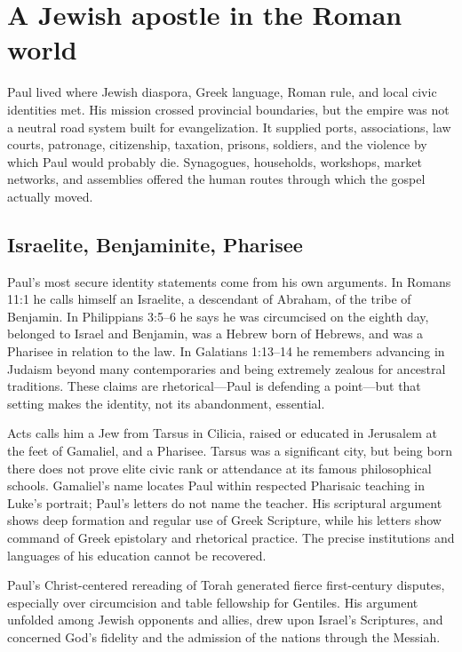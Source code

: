 \section{A Jewish apostle in the Roman world}\label{sec:paul-world}

Paul lived where Jewish diaspora, Greek language, Roman rule, and local civic
identities met. His mission crossed provincial boundaries, but the empire was
not a neutral road system built for evangelization. It supplied ports,
associations, law courts, patronage, citizenship, taxation, prisons, soldiers,
and the violence by which Paul would probably die. Synagogues, households,
workshops, market networks, and assemblies offered the human routes through
which the gospel actually moved.

\subsection{Israelite, Benjaminite, Pharisee}

Paul's most secure identity statements come from his own arguments. In
Romans 11:1 he calls himself an Israelite, a descendant of Abraham, of the
tribe of Benjamin. In Philippians 3:5--6 he says he was circumcised on the
eighth day, belonged to Israel and Benjamin, was a Hebrew born of Hebrews, and
was a Pharisee in relation to the law. In Galatians 1:13--14 he remembers
advancing in Judaism beyond many contemporaries and being extremely zealous
for ancestral traditions. These claims are rhetorical---Paul is defending a
point---but that setting makes the identity, not its abandonment, essential.

Acts calls him a Jew from Tarsus in Cilicia, raised or educated in Jerusalem
at the feet of Gamaliel, and a Pharisee. Tarsus was a significant city, but
being born there does not prove elite civic rank or attendance at its famous
philosophical schools. Gamaliel's name locates Paul within respected Pharisaic
teaching in Luke's portrait; Paul's letters do not name the teacher. His
scriptural argument shows deep formation and regular use of Greek Scripture,
while his letters show command of Greek epistolary and rhetorical practice.
The precise institutions and languages of his education cannot be recovered.

Paul's Christ-centered rereading of Torah generated fierce first-century
disputes, especially over circumcision and table fellowship for Gentiles. His
argument unfolded among Jewish opponents and allies, drew upon Israel's
Scriptures, and concerned God's fidelity and the admission of the nations
through the Messiah.

